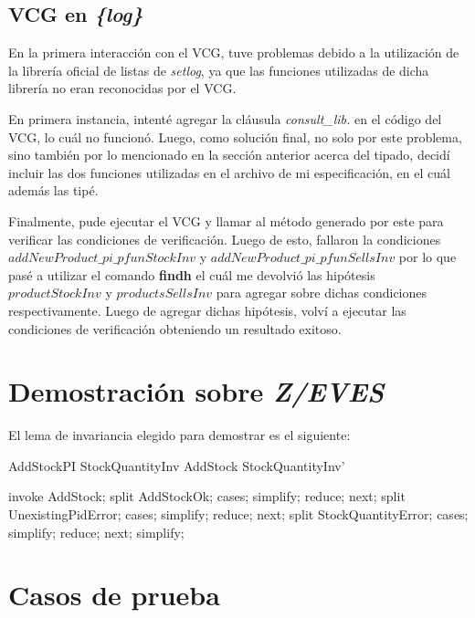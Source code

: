 \documentclass[fleqn,colorlinks,linkcolor=blue,citecolor=blue,urlcolor=blue]{article}
\begin{document}
\subsection{VCG en \textit{\{log\}}}

En la primera interacción con el VCG, tuve problemas debido a la utilización de la librería oficial de listas de \textit{setlog}, ya que las funciones utilizadas de dicha librería no eran reconocidas por el VCG.

En primera instancia, intenté agregar la cláusula \textit{consult\_lib.} en el código del VCG, lo cuál no funcionó. Luego, como solución final, no solo por este problema, sino también por lo mencionado en la sección anterior acerca del tipado, decidí incluir las dos funciones utilizadas en el archivo de mi especificación, en el cuál además las tipé.

Finalmente, pude ejecutar el VCG y llamar al método generado por este para verificar las condiciones de verificación. Luego de esto, fallaron la condiciones $addNewProduct\_pi\_pfunStockInv$ y $addNewProduct\_pi\_pfunSellsInv$ por lo que pasé a utilizar el comando \textbf{findh} el cuál me devolvió las hipótesis $productStockInv$ y $productsSellsInv$ para agregar sobre dichas condiciones respectivamente. Luego de agregar dichas hipótesis, volví a ejecutar las condiciones de verificación obteniendo un resultado exitoso. 

\section{Demostración sobre \textit{Z/EVES}}

El lema de invariancia elegido para demostrar es el siguiente:

\begin{theorem}{AddStockPI}
StockQuantityInv \wedge AddStock \implies StockQuantityInv'
\end{theorem}

\begin{zproof}[AddUserRightPI]
invoke AddStock;
split AddStockOk;
cases;
simplify;
reduce;
next;
split UnexistingPidError;
cases;
simplify;
reduce;
next;
split StockQuantityError;
cases;
simplify;
reduce;
next;
simplify;
\end{zproof}

\section{Casos de prueba}
\end{document}
